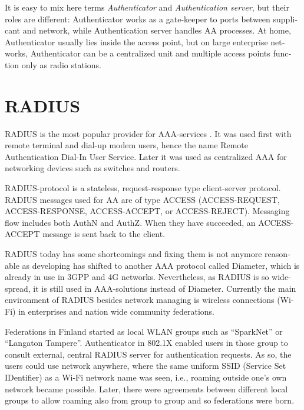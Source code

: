 \documentclass[12pt,a4paper,english]{tutthesis}
\begin{document}
\begin{otherlanguage}{english}
It is easy to mix here terms \emph{Authenticator} and \emph{Authentication
server}, but their roles are different: Authenticator works as a
gate-keeper to ports between supplicant and network, while
Authentication server handles AA processes.
At home, Authenticator usually lies inside the access point, but 
on large enterprise networks, Authenticator can be a centralized unit 
and multiple access points function only as radio stations.



\section{RADIUS}
\label{sec-2-2}
\label{sec:radius}
RADIUS is the most popular provider for AAA-services
\cite[p.75]{radius-popular}.  It was used first with remote terminal
and dial-up modem users, hence the name Remote Authentication Dial-In
User Service. Later it was used as centralized AAA for networking
devices such as switches and routers.  




RADIUS-protocol is a stateless, request-response type client-server
protocol. RADIUS messages used for AA are of type ACCESS  (ACCESS-REQUEST,
ACCESS-RESPONSE, ACCESS-ACCEPT, or ACCESS-REJECT). 
Messaging flow includes both AuthN and AuthZ. When they have
succeeded, an ACCESS-ACCEPT message is sent back to the client.





RADIUS today has some shortcomings and fixing them is not anymore reasonable
as developing has shifted to another AAA protocol called Diameter,
which is already in use in 3GPP and 4G networks\cite{diameter}. 
Nevertheless, as RADIUS is so wide-spread, it is still used in 
AAA-solutions instead of Diameter.
Currently the main environment of  RADIUS 
besides network managing is wireless connections (Wi-Fi) in
enterprises and nation wide community federations.

Federations in Finland started as local WLAN groups such as ``SparkNet'' or
``Langaton Tampere''.  Authenticator in 802.1X enabled users in those group
to consult external, central RADIUS server for authentication
requests. As so, the users could use network anywhere, where the same
uniform SSID (Service Set IDentifier) as a Wi-Fi network name was
seen, i.e., roaming  outside one's own network became possible.
Later, there were agreements between different local groups to allow 
roaming also from group to group and so federations were born.


\end{otherlanguage}
\end{document}
